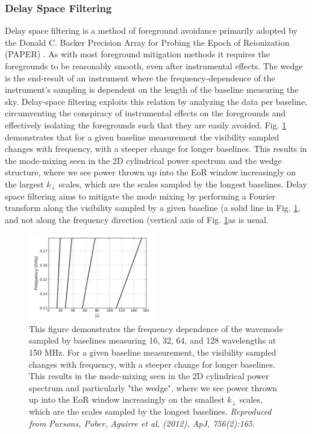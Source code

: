 \subsubsection{Delay Space Filtering}
Delay space filtering is a method of foreground avoidance primarily adopted by the Donald C. Backer Precision Array for Probing the Epoch of Reionization (PAPER) \cite{Parsons2010AJ....139.1468P}. As with most foreground mitigation methods it requires the foregrounds to be reasonably smooth, even after instrumental effects. The wedge is the end-result of an instrument where the frequency-dependence of the instrument's sampling is dependent on the length of the baseline measuring the sky. Delay-space filtering exploits this relation by analyzing the data per baseline, circumventing the conspiracy of instrumental effects on the foregrounds and effectively isolating the foregrounds such that they are easily avoided. Fig. \ref{fig:baselines} demonstrates that for a given baseline measurement the visibility sampled changes with frequency, with a steeper change for longer baselines. This results in the mode-mixing seen in the 2D cylindrical power spectrum and the wedge structure, where we see power thrown up into the EoR window increasingly on the largest $k_\bot$ scales, which are the scales sampled by the longest baselines. Delay space filtering aims to mitigate the mode mixing by performing a Fourier transform along the visibility sampled by a given baseline (a solid line in Fig. \ref{fig:baselines}, and not along the frequency direction (vertical axis of Fig. \ref{fig:baselines}as is usual.

\begin{figure}
\begin{center}
    \includegraphics[width=0.5\textwidth]{Chapman_Jelic/Images/baselines.png}
\end{center}
    \caption{This figure demonstrates the frequency dependence of the wavemode sampled by baselines measuring 16, 32, 64, and 128 wavelengths at 150 MHz. For a given baseline measurement, the visibility sampled changes with frequency, with a steeper change for longer baselines. This results in the mode-mixing seen in the 2D cylindrical power spectrum and particularly "the wedge", where we see power thrown up into the EoR window increasingly on the smallest $k_\bot$ scales, which are the scales sampled by the longest baselines. \textit{Reproduced from Parsons, Pober, Aguirre et al. (2012), ApJ, 756(2):165}.}
    \label{fig:baselines}
\end{figure}

